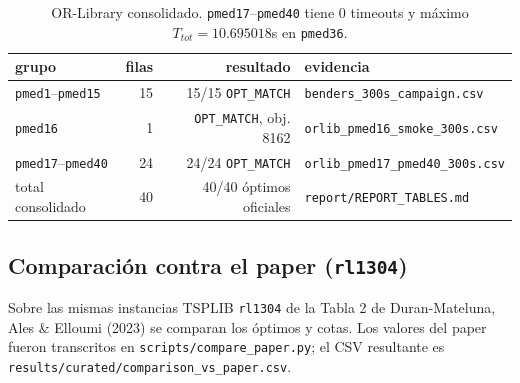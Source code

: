 \begin{table}[h]\centering\small
\begin{tabular}{lrrl}
\toprule
grupo & filas & resultado & evidencia \\
\midrule
\texttt{pmed1}--\texttt{pmed15} & 15 & 15/15 \texttt{OPT\_MATCH} & \texttt{benders\_300s\_campaign.csv} \\
\texttt{pmed16} & 1 & \texttt{OPT\_MATCH}, obj. 8162 & \texttt{orlib\_pmed16\_smoke\_300s.csv} \\
\texttt{pmed17}--\texttt{pmed40} & 24 & 24/24 \texttt{OPT\_MATCH} & \texttt{orlib\_pmed17\_pmed40\_300s.csv} \\
\midrule
total consolidado & 40 & 40/40 óptimos oficiales & \texttt{report/REPORT\_TABLES.md} \\
\bottomrule
\end{tabular}
\caption{OR-Library consolidado. \texttt{pmed17}--\texttt{pmed40} tiene 0 timeouts y máximo
$T_{tot}=10.695018$s en \texttt{pmed36}.}
\label{tab:orlib40}
\end{table}

\subsection{Comparación contra el paper (\texttt{rl1304})}
Sobre las mismas instancias TSPLIB \texttt{rl1304} de la Tabla 2 de Duran-Mateluna, Ales \&
Elloumi (2023) se comparan los óptimos y cotas. Los valores del paper fueron transcritos en
\texttt{scripts/compare\_paper.py}; el CSV resultante es
\texttt{results/curated/comparison\_vs\_paper.csv}.

